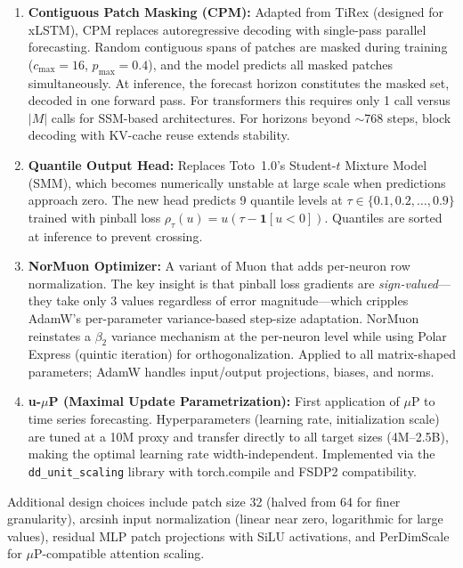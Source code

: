 \documentclass[11pt,a4paper]{article}
\begin{document}
\begin{enumerate}[nosep]
    \item \textbf{Contiguous Patch Masking (CPM):} Adapted from TiRex (designed for xLSTM), CPM replaces autoregressive decoding with single-pass parallel forecasting. Random contiguous spans of patches are masked during training ($c_{\mathrm{max}} = 16$, $p_{\mathrm{max}} = 0.4$), and the model predicts all masked patches simultaneously. At inference, the forecast horizon constitutes the masked set, decoded in one forward pass. For transformers this requires only 1 call versus $|M|$ calls for SSM-based architectures. For horizons beyond $\sim$768 steps, block decoding with KV-cache reuse extends stability.

    \item \textbf{Quantile Output Head:} Replaces Toto~1.0's Student-$t$ Mixture Model (SMM), which becomes numerically unstable at large scale when predictions approach zero. The new head predicts 9 quantile levels at $\tau \in \{0.1, 0.2, \ldots, 0.9\}$ trained with pinball loss $\rho_\tau(u) = u(\tau - \mathbf{1}[u < 0])$. Quantiles are sorted at inference to prevent crossing.

    \item \textbf{NorMuon Optimizer:} A variant of Muon that adds per-neuron row normalization. The key insight is that pinball loss gradients are \emph{sign-valued}---they take only 3 values regardless of error magnitude---which cripples AdamW's per-parameter variance-based step-size adaptation. NorMuon reinstates a $\beta_2$ variance mechanism at the per-neuron level while using Polar Express (quintic iteration) for orthogonalization. Applied to all matrix-shaped parameters; AdamW handles input/output projections, biases, and norms.

    \item \textbf{u-$\mu$P (Maximal Update Parametrization):} First application of $\mu$P to time series forecasting. Hyperparameters (learning rate, initialization scale) are tuned at a 10M proxy and transfer directly to all target sizes (4M--2.5B), making the optimal learning rate width-independent. Implemented via the \texttt{dd\_unit\_scaling} library with torch.compile and FSDP2 compatibility.
\end{enumerate}

Additional design choices include patch size 32 (halved from 64 for finer granularity), arcsinh input normalization (linear near zero, logarithmic for large values), residual MLP patch projections with SiLU activations, and PerDimScale for $\mu$P-compatible attention scaling.
\end{document}
